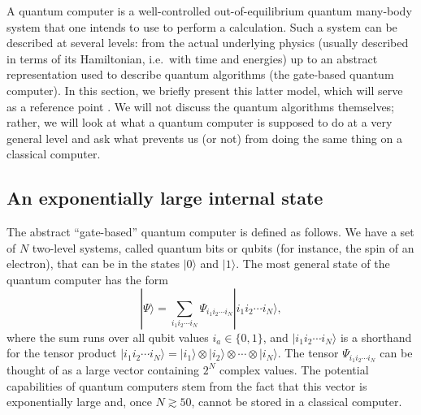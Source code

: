 \documentclass{SciPost}
\newcommand{\ket}[1]{|#1\rangle}
\begin{document}
A quantum computer is a well-controlled out-of-equilibrium quantum many-body system
that one intends to use to perform a calculation. Such a system can be described at several levels: from the actual underlying physics (usually described in terms of its Hamiltonian, i.e.\ with time and energies) up to an abstract representation used to describe quantum algorithms (the gate-based quantum computer). In this section, we briefly present this latter model, which will serve as a reference point \cite{nielsen2000}. We will not discuss the quantum algorithms themselves; rather, we will look at what a quantum computer is supposed to do at a very general level and ask what prevents us (or not) from doing the same thing on a classical computer.

\subsection{An exponentially large internal state}
The abstract ``gate-based'' quantum computer is defined as follows. We have a set of
$N$ two-level systems, called quantum bits or qubits (for instance, the spin of an electron), that can be in the states $\ket{0}$ and $\ket{1}$. The most general state of the quantum computer has the form
\begin{equation}
\ket{\Psi} = \sum_{i_1i_2\cdots i_N} \Psi_{i_1i_2\cdots i_N} \ket{i_1i_2\cdots i_N},
\end{equation}
where the sum runs over all qubit values $i_a \in \{0,1\}$, and
$\ket{i_1i_2\cdots i_N}$ is a shorthand for the tensor product
$\ket{i_1i_2\cdots i_N} = \ket{i_1}\otimes \ket{i_2}\otimes\cdots\otimes\ket{i_N}$.
The tensor $\Psi_{i_1i_2\cdots i_N}$ can be thought of as a large vector containing $2^N$
complex values. The potential capabilities of quantum computers stem from the fact that this vector is exponentially large and, once $N\gtrsim 50$, cannot be stored in a classical computer.
\end{document}
